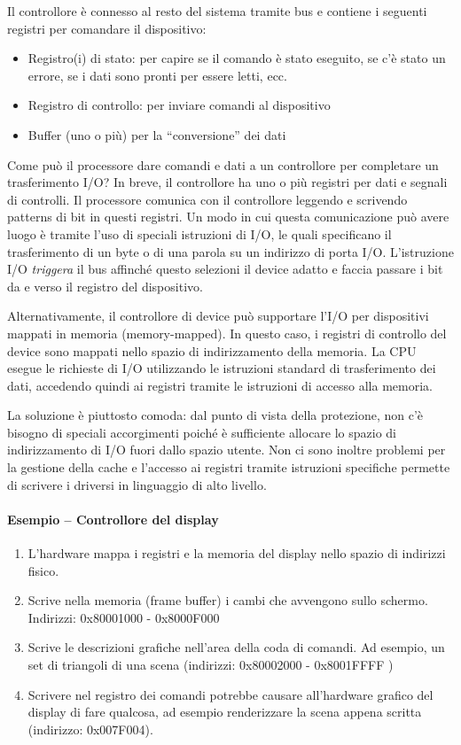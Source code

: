 \documentclass[a4paper]{article}
\begin{document}
Il controllore è connesso al resto del sistema tramite bus e contiene i seguenti registri per comandare il dispositivo:
\begin{itemize}
    \item Registro(i) di stato: per capire se il comando è stato eseguito, se c'è stato un errore, se i dati sono pronti per essere letti, ecc.
    \item Registro di controllo: per inviare comandi al dispositivo
    \item Buffer (uno o più) per la ``conversione'' dei dati
\end{itemize}

Come può il processore dare comandi e dati a un controllore per completare un trasferimento I/O? In breve, il controllore ha uno o più registri per dati e segnali di controlli. Il processore comunica con il controllore leggendo e scrivendo patterns di bit in questi registri. Un modo in cui questa comunicazione può avere luogo è tramite l'uso di speciali istruzioni di I/O, le quali specificano il trasferimento di un byte o di una parola su un indirizzo di porta I/O. L'istruzione I/O \textit{triggera} il bus affinché questo selezioni il device adatto e faccia passare i bit da e verso il registro del dispositivo.

Alternativamente, il controllore di device può supportare l'I/O per dispositivi mappati in memoria (memory-mapped). In questo caso, i registri di controllo del device sono mappati nello spazio di indirizzamento della memoria. La CPU esegue le richieste di I/O utilizzando le istruzioni standard di trasferimento dei dati, accedendo quindi ai registri tramite le istruzioni di accesso alla memoria.

La soluzione è piuttosto comoda: dal punto di vista della protezione, non c'è bisogno di speciali accorgimenti poiché è sufficiente allocare lo spazio di indirizzamento di I/O fuori dallo spazio utente. Non ci sono inoltre problemi per la gestione della cache e l'accesso ai registri tramite istruzioni specifiche permette di scrivere i driversi in linguaggio di alto livello.

\paragraph {Esempio -- Controllore del display}
\begin{enumerate}
    \item L'hardware mappa i registri e la memoria del display nello spazio di indirizzi fisico.
    \item Scrive nella memoria (frame buffer) i cambi che avvengono sullo schermo. Indirizzi: 0x80001000 - 0x8000F000
    \item Scrive le descrizioni grafiche nell'area della coda di comandi. Ad esempio, un set di triangoli di una scena (indirizzi: 0x80002000 - 0x8001FFFF )
    \item Scrivere nel registro dei comandi potrebbe causare all'hardware grafico del display di fare qualcosa, ad esempio renderizzare la scena appena scritta (indirizzo: 0x007F004).
\end{enumerate}
\end{document}
